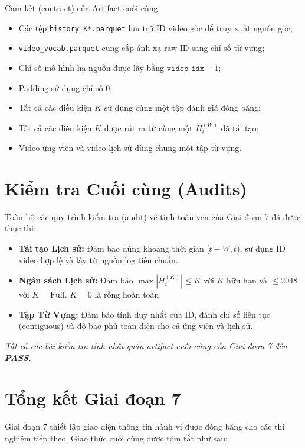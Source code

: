 \documentclass[12pt,a4paper]{article}
\begin{document}
Cam kết (contract) của Artifact cuối cùng:
\begin{itemize}[noitemsep]
    \item Các tệp \texttt{history\_K*.parquet} lưu trữ ID video gốc để truy xuất nguồn gốc;
    \item \texttt{video\_vocab.parquet} cung cấp ánh xạ raw-ID sang chỉ số từ vựng;
    \item Chỉ số mô hình hạ nguồn được lấy bằng $\texttt{video\_idx} + 1$;
    \item Padding sử dụng chỉ số $0$;
    \item Tất cả các điều kiện $K$ sử dụng cùng một tập đánh giá đóng băng;
    \item Tất cả các điều kiện $K$ được rút ra từ cùng một $H_t^{(W)}$ đã tái tạo;
    \item Video ứng viên và video lịch sử dùng chung một tập từ vựng.
\end{itemize}

\section{Kiểm tra Cuối cùng (Audits)}
Toàn bộ các quy trình kiểm tra (audit) về tính toàn vẹn của Giai đoạn 7 đã được thực thi:
\begin{itemize}
    \item \textbf{Tái tạo Lịch sử:} Đảm bảo đúng khoảng thời gian $[t-W, t)$, sử dụng ID video hợp lệ và lấy từ nguồn log tiêu chuẩn.
    \item \textbf{Ngân sách Lịch sử:} Đảm bảo $\max |H_t^{(K)}| \leq K$ với $K$ hữu hạn và $\leq 2048$ với $K=\mathrm{Full}$. $K=0$ là rỗng hoàn toàn.
    \item \textbf{Tập Từ Vựng:} Đảm bảo tính duy nhất của ID, đánh chỉ số liên tục (contiguous) và độ bao phủ toàn diện cho cả ứng viên và lịch sử.
\end{itemize}
\textit{Tất cả các bài kiểm tra tính nhất quán artifact cuối cùng của Giai đoạn 7 đều \textbf{PASS}.}

\section{Tổng kết Giai đoạn 7}
Giai đoạn 7 thiết lập giao diện thông tin hành vi được đóng băng cho các thí nghiệm tiếp theo. Giao thức cuối cùng được tóm tắt như sau:
\end{document}

